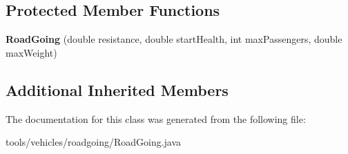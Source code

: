 \subsection*{Protected Member Functions}
\begin{DoxyCompactItemize}
\item 
{\bfseries Road\+Going} (double resistance, double start\+Health, int max\+Passengers, double max\+Weight)\hypertarget{classtools_1_1vehicles_1_1roadgoing_1_1_road_going_a22e3bd1921919409ad745d2eb12bb4f8}{}\label{classtools_1_1vehicles_1_1roadgoing_1_1_road_going_a22e3bd1921919409ad745d2eb12bb4f8}

\end{DoxyCompactItemize}
\subsection*{Additional Inherited Members}


The documentation for this class was generated from the following file\+:\begin{DoxyCompactItemize}
\item 
tools/vehicles/roadgoing/Road\+Going.\+java\end{DoxyCompactItemize}
